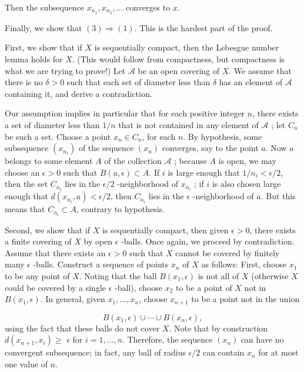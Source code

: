 Then the subsequence \(x_{n_{1}},x_{n_{2}},\ldots\) converges to \(x\).

Finally, we show that \(( 3) \Rightarrow (1)\). This is the hardest part of the proof.

First, we show that if \(X\) is sequentially compact, then the Lebesgue number lemma holds for \(X\). (This would follow from compactness, but compactness is what we are trying to prove!) Let \(\mathcal{A}\) be an open covering of \(X\). We assume that there is no \(\delta > 0\) such that each set of diameter less than \(\delta\) has an element of \(\mathcal{A}\) containing it, and derive a contradiction.

Our assumption implies in particular that for each positive integer \(n\), there exists a set of diameter less than \(1/n\) that is not contained in any element of \(\mathcal{A}\) ; let \(C_{n}\) be such a set. Choose a point \(x_{n} \in {C}_{n}\), for each \(n\). By hypothesis, some subsequence \(( x_{n_{i}})\) of the sequence \(( x_{n})\) converges, say to the point \(a\). Now \(a\) belongs to some element \(A\) of the collection \(\mathcal{A}\) ; because \(A\) is open, we may choose an \(\epsilon > 0\) such that \(B( {a,\epsilon }) \subset A\). If \(i\) is large enough that \(1/n_{i} < \epsilon /2\), then the set \(C_{n_{i}}\) lies in the \(\epsilon /2\) -neighborhood of \(x_{n_{i}}\) ; if \(i\) is also chosen large enough that \(d( {x_{n_{i}},a}) < \epsilon /2\), then \(C_{n_{i}}\) lies in the \(\epsilon\) -neighborhood of \(a\). But this means that \(C_{n_{i}} \subset A\), contrary to hypothesis.

Second, we show that if \(X\) is sequentially compact, then given \(\epsilon > 0\), there exists a finite covering of \(X\) by open \(\epsilon\) -balls. Once again, we proceed by contradiction. Assume that there exists an \(\epsilon > 0\) such that \(X\) cannot be covered by finitely many \(\epsilon\) -balls. Construct a sequence of points \(x_{n}\) of \(X\) as follows: First, choose \(x_{1}\) to be any point of \(X\). Noting that the ball \(B( {x_{1},\epsilon })\) is not all of \(X\) (otherwise \(X\) could be covered by a single \(\epsilon\) -ball), choose \(x_{2}\) to be a point of \(X\) not in \(B( {x_{1},\epsilon })\). In general, given \(x_{1},\ldots ,x_{n}\), choose \(x_{n + 1}\) to be a point not in the union

\[
B( {x_{1},\epsilon }) \cup \cdots \cup B( {x_{n},\epsilon }),
\]
using the fact that these balls do not cover \(X\). Note that by construction \(d( {x_{n + 1},x_{i}}) \geq\) \(\epsilon\) for \(i = 1,\ldots, n\). Therefore, the sequence \(( x_{n})\) can have no convergent subsequence; in fact, any ball of radius \(\epsilon /2\) can contain \(x_{n}\) for at most one value of \(n\).

